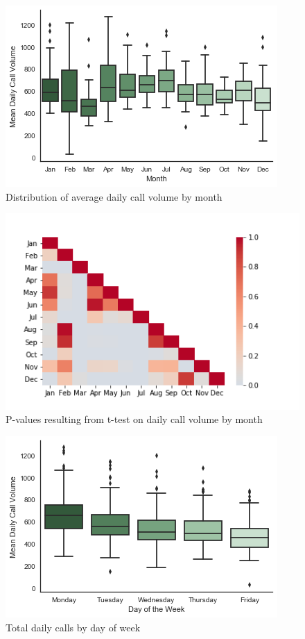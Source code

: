 \documentclass{article}
\begin{document}
\begin{figure}[p]
  \includegraphics[scale=.6]{monthly_boxplot.png}
  \caption{Distribution of average daily call volume by month}
\end{figure}

\begin{figure}[p]
	\includegraphics[scale=.5]{Heatmap.png}
	\caption{P-values resulting from t-test on daily call volume by month}
\end{figure}


\begin{figure}[p]
	\includegraphics[scale=.6]{Daily_Call_Boxplot.png}
	\caption{Total daily calls by day of week}
\end{figure}
\end{document}
